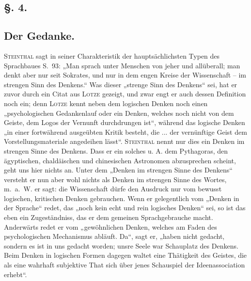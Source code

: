 \subsection*{§. 4.}\label{I.I.4}
\subsection*{Der Gedanke.}

\begin{sloppypar}\textsc{Steinthal} sagt in seiner Charakteristik der hauptsächlichsten Typen des Sprachbaues S.~93: „Man sprach unter Menschen von jeher und allüberall; man denkt aber nur seit Sokrates, und nur in dem engen Kreise der Wissenschaft – im strengen Sinn des Denkens.“ Was dieser „strenge Sinn des Denkens“ sei, hat er zuvor durch ein Citat aus \textsc{Lotze} gezeigt, und zwar engt er auch dessen Definition noch ein; denn \textsc{Lotze} kennt neben dem logischen Denken noch einen „psychologischen Gedankenlauf oder ein Denken, welches noch nicht von dem Geiste, dem Logos der Vernunft durchdrungen ist“, während das logische Denken „in einer fortwährend ausgeübten Kritik besteht, die ... der vernünftige Geist dem Vorstellungsmateriale angedeihen lässt“. \textsc{Steinthal} nennt nur dies ein Denken im strengen Sinne des Denkens. Dass er ein solches u. A. dem Pythagoras, den ägyptischen, chaldäischen und chinesischen Astronomen abzusprechen scheint, geht uns hier nichts an. Unter dem „Denken im strengen Sinne des Denkens“ versteht er nun aber wohl nichts  als Denken im strengen Sinne des Wortes, m.~a.~W. er sagt: die Wissenschaft dürfe den Ausdruck nur vom bewusst logischen, kritischen Denken gebrauchen. Wenn er gelegentlich vom „Denken in der Sprache“ redet, das „noch kein echt und rein logisches Denken“ sei, so ist das eben ein Zugeständniss, das er dem gemeinen Sprachgebrauche macht. Anderwärts redet er vom „gewöhnlichen Denken, welches am Faden des psychologischen Mechanismus abläuft. Da“, sagt er, „haben nicht  gedacht, sondern es ist in uns gedacht worden; unsre Seele war Schauplatz des Denkens. Beim Denken in logischen Formen dagegen waltet eine Thätigkeit des Geistes, die als \label{sp.7} eine wahrhaft subjektive That sich über jenes Schauspiel der Ideenassociation erhebt“.\end{sloppypar}

\label{fp.8}

